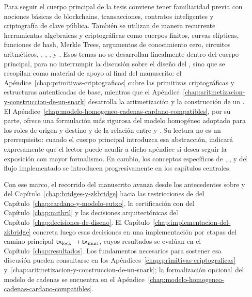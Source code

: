 Para seguir el cuerpo principal de la tesis conviene tener familiaridad previa con nociones básicas de blockchains, transacciones, contratos inteligentes y criptografía de clave pública. También se utilizan de manera recurrente herramientas algebraicas y criptográficas como cuerpos finitos, curvas elípticas, funciones de hash, Merkle Trees, argumentos de conocimiento cero, circuitos aritméticos, \ROneCS, \QAP, \KZG, \FiatShamir y \Groth. Esos temas no se desarrollan linealmente dentro del cuerpo principal, para no interrumpir la discusión sobre el diseño del \zkBridge, sino que se recopilan como material de apoyo al final del manuscrito: el Apéndice~\ref{chap:primitivas-criptograficas} cubre las primitivas criptográficas y estructuras autenticadas de base, mientras que el Apéndice~\ref{chap:aritmetizacion-y-construccion-de-un-snark} desarrolla la aritmetización y la construcción de un \SNARK. El Apéndice~\ref{chap:modelo-homogeneo-cadenas-cardano-compatibles}, por su parte, ofrece una formulación más rigurosa del modelo homogéneo adoptado para los roles de origen y destino y de la relación entre \LockTx y \MintTx. Su lectura no es un prerrequisito: cuando el cuerpo principal introduzca esa abstracción, indicará expresamente que el lector puede acudir a dicho apéndice si desea seguir la exposición con mayor formalismo. En cambio, los conceptos específicos de \Cardano, \eUTxO, \Mithril y del flujo implementado se introducen progresivamente en los capítulos centrales.

Con ese marco, el recorrido del manuscrito avanza desde los antecedentes sobre \Bridges y \zkBridge del Capítulo~\ref{chap:bridges-y-zkbridge} hacia las restricciones de \Cardano del Capítulo~\ref{chap:cardano-y-modelo-eutxo}, la certificación con \Mithril del Capítulo~\ref{chap:mithril} y las decisiones arquitectónicas del Capítulo~\ref{chap:decisiones-de-diseno}. El Capítulo~\ref{chap:implementacion-del-zkbridge} concreta luego esas decisiones en una implementación por etapas del camino principal \(\mathsf{tx}_{\mathrm{lock}} \rightarrow \mathsf{tx}_{\mathrm{mint}}\), cuyos resultados se evalúan en el Capítulo~\ref{chap:resultados}. Los fundamentos necesarios para sostener esa discusión pueden consultarse en los Apéndices~\ref{chap:primitivas-criptograficas} y~\ref{chap:aritmetizacion-y-construccion-de-un-snark}; la formalización opcional del modelo de cadenas se encuentra en el Apéndice~\ref{chap:modelo-homogeneo-cadenas-cardano-compatibles}.
